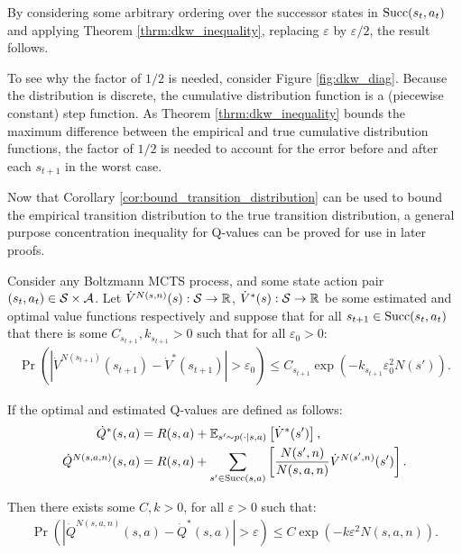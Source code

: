     \begin{proofoutline}
        By considering some arbitrary ordering over the successor states in ${\textnormal{Succ}(s_t,a_t)}$ and applying Theorem \ref{thrm:dkw_inequality}, replacing $\varepsilon$ by $\varepsilon/2$, the result follows.

        To see why the factor of $1/2$ is needed, consider Figure \ref{fig:dkw_diag}. Because the distribution is discrete, the cumulative distribution function is a (piecewise constant) step function. As Theorem \ref{thrm:dkw_inequality} bounds the maximum difference between the empirical and true cumulative distribution functions, the factor of $1/2$ is needed to account for the error before and after each $s_{t+1}$ in the worst case.
    \end{proofoutline}









    






        


    Now that Corollary \ref{cor:bound_transition_distribution} can be used to bound  the empirical transition distribution to the true transition distribution,  a general purpose concentration inequality for Q-values can be proved for use in later proofs.
    
    \begin{lemma} \label{lem:stochastic_step}
        Consider any Boltzmann MCTS process, and some state action pair $(s_t,a_t)\in\mathcal{S}\times\mathcal{A}$. Let $\dot{V}^{N(s,n)}(s):\mathcal{S}\rightarrow \mathbb{R}$, $\dot{V}^*(s):\mathcal{S}\rightarrow \mathbb{R}$ be some estimated and optimal value functions respectively and suppose that for all $s_{t+1}\in{\textnormal{Succ}(s_t,a_t)}$ that there is some $C_{s_{t+1}}, k_{s_{t+1}}>0$ such that for all $\varepsilon_0 >0$:
        \begin{align}
            \Pr\left(\left| \dot{V}^{N(s_{t+1})}(s_{t+1}) - \dot{V}^*(s_{t+1}) \right| > \varepsilon_0 \right) \leq C_{s_{t+1}}\exp(-k_{s_{t+1}}\varepsilon_0^2 N(s')).
        \end{align}
        
        If the optimal and estimated Q-values are defined as follows: 
        \begin{align}
            \dot{Q}^*(s,a)&=R(s,a)+\mathbb{E}_{s'\sim p(\cdot|s,a)}\left[\dot{V}^*(s')\right], \\
            \dot{Q}^{N(s,a,n)}(s,a)&=R(s,a)+\sum_{s'\in{\textnormal{Succ}(s,a)}} \left[
                \frac{N(s',n)}{N(s,a,n)} \dot{V}^{N(s',n)}(s')\right].
        \end{align}
        
        Then there exists some $C,k>0$, for all $\varepsilon>0$ such that:
        \begin{align}
            \Pr\left(\left| \dot{Q}^{N(s,a,n)}(s,a) - \dot{Q}^*(s,a) \right| > \varepsilon \right) \leq C\exp(-k\varepsilon^2 N(s,a,n)).
        \end{align}
    \end{lemma}
    
